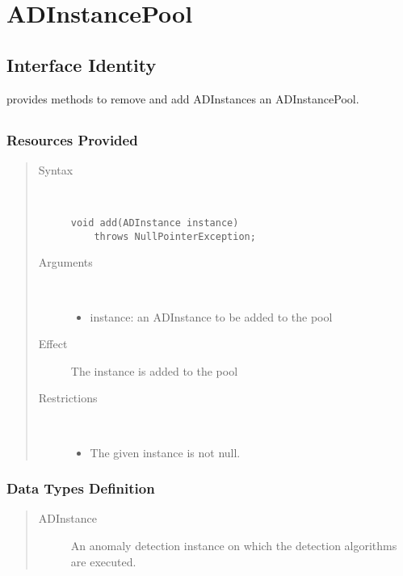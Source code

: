 \section{ADInstancePool}

\subsection{Interface Identity}

\npar {} provides methods to remove and add
ADInstances an ADInstancePool.

\subsection{}

\subsubsection{Resources Provided}

\begin{quote}
	\begin{description}
		\item[Syntax] \ 
		\begin{verbatim}
void add(ADInstance instance) 
    throws NullPointerException;
		\end{verbatim}
		\item[Arguments] \
		\begin{itemize}
			\item instance: an ADInstance to be added to the pool
		\end{itemize}
		\item[Effect] The instance is added to the pool
		\item[Restrictions] \ 
		\begin{itemize}
			\item The given instance is not null.
		\end{itemize}
	\end{description} 
\end{quote}

\subsubsection{Data Types Definition}

\begin{quote}
	\begin{description}
		\item[ADInstance] An anomaly detection instance on which the
		detection algorithms are executed.
	\end{description} 
\end{quote}

